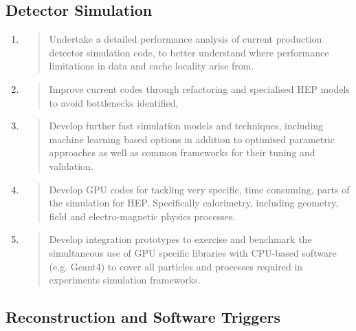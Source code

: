 \documentclass[11pt,a4paper]{article}
\begin{document}
\hypertarget{detector-simulation-1}{%
\subsection{Detector Simulation}\label{detector-simulation-1}}

\begin{enumerate}
\def\labelenumi{\arabic{enumi}.}
\item
  \begin{quote}
  Undertake a detailed performance analysis of current production
  detector simulation code, to better understand where performance
  limitations in data and cache locality arise from.
  \end{quote}
\item
  \begin{quote}
  Improve current codes through refactoring and specialised HEP models
  to avoid bottlenecks identified,
  \end{quote}
\item
  \begin{quote}
  Develop further fast simulation models and techniques, including
  machine learning based options in addition to optimised parametric
  approaches as well as common frameworks for their tuning and
  validation.
  \end{quote}
\item
  \begin{quote}
  Develop GPU codes for tackling very specific, time consuming, parts of
  the simulation for HEP. Specifically calorimetry, including geometry,
  field and electro-magnetic physics processes.
  \end{quote}
\item
  \begin{quote}
  Develop integration prototypes to exercise and benchmark the
  simultaneous use of GPU specific libraries with CPU-based software
  (e.g. Geant4) to cover all particles and processes required in
  experiments simulation frameworks.
  \end{quote}
\end{enumerate}

\hypertarget{reconstruction-and-software-triggers-1}{%
\subsection{Reconstruction and Software
Triggers}\label{reconstruction-and-software-triggers-1}}
\end{document}

